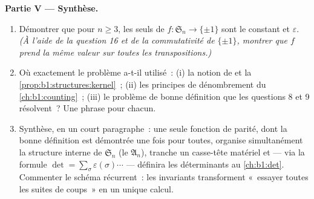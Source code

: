 \begin{problem}
\medskip
\noindent\textbf{Partie V --- Synthèse.}
\begin{enumerate}[resume]
  \item Démontrer que pour $n \geq 3$, les seuls  de
         $f \colon \mathfrak S_n \to \{\pm 1\}$ sont le
         constant et $\varepsilon$. \emph{(À l'aide de la
        question 16 et de la commutativité de $\{\pm1\}$, montrer que
        $f$ prend la même valeur sur toutes les transpositions.)}
  \item Où exactement le problème a-t-il utilisé~: (i) la notion de
         et la \cref{prop:b1:structures:kernel}~; (ii) les
        principes de dénombrement du \cref{ch:b1:counting}~; (iii) le
        problème de bonne définition que les questions 8 et 9
        résolvent~? Une phrase pour chacun.
  \item Synthèse, en un court paragraphe~: une seule fonction de
        parité, dont la bonne définition est démontrée une fois pour
        toutes, organise simultanément la structure interne de
        $\mathfrak S_n$ (le  $\mathfrak A_n$), tranche un
        casse-tête matériel et --- via la formule $\det = \sum_\sigma
        \varepsilon(\sigma)\cdots$ --- définira les déterminants
        au \cref{ch:b1:det}. Commenter le schéma récurrent~: les
        invariants transforment «~essayer toutes les suites de
        coups~» en un unique calcul.
\end{enumerate}
\end{problem}
